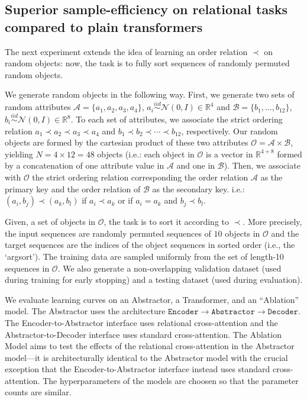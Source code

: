 \subsection{Superior sample-efficiency on relational tasks compared to plain transformers}
The next experiment extends the idea of learning an order relation $\prec$ on random objects: now, the task is to fully sort sequences of randomly permuted random objects.

We generate random objects in the following way. First, we generate two sets of random attributes $\mathcal{A} = \{a_1, a_2, a_3, a_4\}$, $a_i \overset{iid}{\sim} \mathcal{N}(0, I) \in \mathbb{R}^{4}$ and $\mathcal{B} = \{b_1, \ldots, b_{12}\}$, $b_i \overset{iid}{\sim} \mathcal{N}(0, I) \in \mathbb{R}^{8}$. To each set of attributes, we associate the strict ordering relation $a_1 \prec a_2 \prec a_3 \prec a_4$ and $b_1 \prec b_2 \prec \cdots \prec b_{12}$, respectively. Our random objects are formed by the cartesian product of these two attributes $\mathcal{O} = \mathcal{A} \times \mathcal{B}$, yielding $N = 4 \times 12 = 48$ objects (i.e.: each object in $\mathcal{O}$ is a vector in $\mathbb{R}^{4+8}$ formed by a concatenation of one attribute value in $\mathcal{A}$ and one in $\mathcal{B}$). Then, we associate with $\mathcal{O}$ the strict ordering relation corresponding the order relation $\mathcal{A}$ as the primary key and the order relation of $\mathcal{B}$ as the secondary key. i.e.: $(a_i, b_j) \prec (a_k, b_l)$ if $a_i \prec a_k$ or if $a_i = a_k$ and $b_j \prec b_l$.

Given, a set of objects in $\mathcal{O}$, the task is to sort it according to $\prec$. More precisely, the input sequences are randomly permuted sequences of $10$ objects in $\mathcal{O}$ and the target sequences are the indices of the object sequences in sorted order (i.e., the `argsort'). The training data are sampled uniformly from the set of length-10 sequences in $\mathcal{O}$. We also generate a non-overlapping validation dataset (used during training for early stopping) and a testing dataset (used during evaluation).

We evaluate learning curves on an Abstractor, a Transformer, and an ``Ablation'' model. The Abstractor uses the architecture $\texttt{Encoder} \to \texttt{Abstractor} \to \texttt{Decoder}$. The Encoder-to-Abstractor interface uses relational cross-attention and the Abstractor-to-Decoder interface uses standard cross-attention. The Ablation Model aims to test the effects of the relational cross-attention in the Abstractor model---it is architecturally identical to the Abstractor model with the crucial exception that the Encoder-to-Abstractor interface instead uses standard cross-attention. The hyperparameters of the models are choosen so that the parameter counts are similar. %


